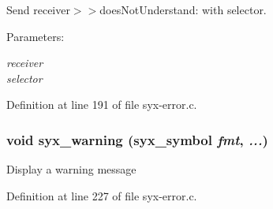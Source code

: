 Send receiver$>$$>$doesNotUnderstand: with selector.

\begin{Desc}
\item[Parameters:]
\begin{description}
\item[{\em receiver}]\item[{\em selector}]\end{description}
\end{Desc}


Definition at line 191 of file syx-error.c.\hypertarget{syx-error_8c_d59b90d0a65496b7c93929d6b767b391}{
\subsubsection{\setlength{\rightskip}{0pt plus 5cm}void syx\_\-warning ({\bf syx\_\-symbol} {\em fmt}, \/   {\em ...})}}
\label{syx-error_8c_d59b90d0a65496b7c93929d6b767b391}


Display a warning message 

Definition at line 227 of file syx-error.c.